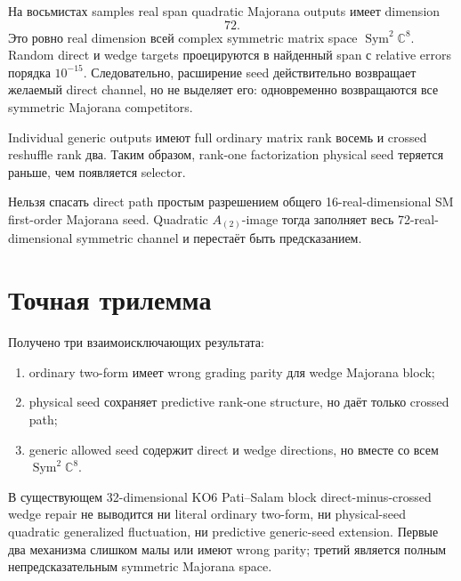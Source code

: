 На восьмистах samples real span quadratic Majorana outputs имеет dimension
\begin{equation}
 \boxed{72}.
 \label{eq:ps-generic-a2-span}
\end{equation}
Это ровно real dimension всей complex symmetric matrix space
\(\operatorname{Sym}^2\mathbb C^8\). Random direct и wedge targets
проецируются в найденный span с relative errors порядка \(10^{-15}\).
Следовательно, расширение seed действительно возвращает желаемый direct
channel, но не выделяет его: одновременно возвращаются все symmetric
Majorana competitors.

Individual generic outputs имеют full ordinary matrix rank восемь и crossed
reshuffle rank два. Таким образом, rank-one factorization physical seed
теряется раньше, чем появляется selector.

\begin{nogocriterion}
Нельзя спасать direct path простым разрешением общего 16-real-dimensional
SM first-order Majorana seed. Quadratic \(A_{(2)}\)-image тогда заполняет весь
72-real-dimensional symmetric channel и перестаёт быть предсказанием.
\end{nogocriterion}

\section{Точная трилемма}

Получено три взаимоисключающих результата:
\begin{enumerate}
 \item ordinary two-form имеет wrong grading parity для wedge Majorana block;
 \item physical seed сохраняет predictive rank-one structure, но даёт только
 crossed path;
 \item generic allowed seed содержит direct и wedge directions, но вместе со
 всем \(\operatorname{Sym}^2\mathbb C^8\).
\end{enumerate}

\begin{theorem}
В существующем 32-dimensional KO6 Pati--Salam block direct-minus-crossed
wedge repair не выводится ни literal ordinary two-form, ни physical-seed
quadratic generalized fluctuation, ни predictive generic-seed extension.
Первые два механизма слишком малы или имеют wrong parity; третий является
полным непредсказательным symmetric Majorana space.
\end{theorem}


